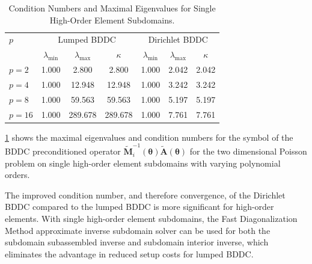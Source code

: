 \documentclass[review]{siamart190516}
\begin{document}
\begin{table}[ht!]
\begin{center}
\begin{tabular}{l ccc ccc}
  \toprule
  $p$  &  \multicolumn{3}{c}{Lumped BDDC}  &  \multicolumn{3}{c}{Dirichlet BDDC}  \\
                      &  $\lambda_{\text{min}}$  &  $\lambda_{\text{max}}$  &  $\kappa$ & $\lambda_{\text{min}}$  &  $\lambda_{\text{max}}$ & $\kappa$  \\
  \toprule
  $p = 2$   &  1.000  &    2.800  &    2.800  &  1.000  &  2.042  &  2.042  \\
  $p = 4$   &  1.000  &   12.948  &   12.948  &  1.000  &  3.242  &  3.242  \\
  $p = 8$   &  1.000  &   59.563  &   59.563  &  1.000  &  5.197  &  5.197  \\
  $p = 16$  &  1.000  &  289.678  &  289.678  &  1.000  &  7.761  &  7.761  \\
  \bottomrule
\end{tabular}
\end{center}
\caption{Condition Numbers and Maximal Eigenvalues for Single High-Order Element Subdomains.}
\label{table:high_order_element_bddc}
\end{table}

\cref{table:high_order_element_bddc} shows the maximal eigenvalues and condition numbers for the symbol of the BDDC preconditioned operator $\tilde{\mathbf{M}}^{-1}_i \left( \boldsymbol{\theta} \right) \tilde{\mathbf{A}} \left( \boldsymbol{\theta} \right)$ for the two dimensional Poisson problem on single high-order element subdomains with varying polynomial orders.

The improved condition number, and therefore convergence, of the Dirichlet BDDC compared to the lumped BDDC is more significant for high-order elements.
With single high-order element subdomains, the Fast Diagonalization Method approximate inverse subdomain solver can be used for both the subdomain subassembled inverse and subdomain interior inverse, which eliminates the advantage in reduced setup costs for lumped BDDC.
\end{document}
